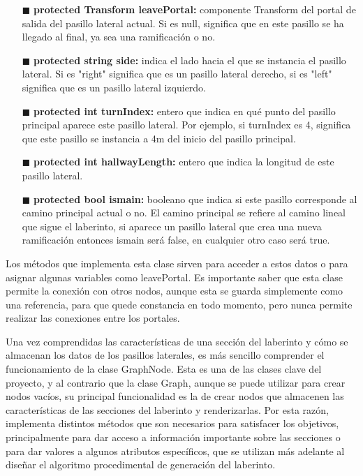\documentclass[../main.tex]{subfiles}
\begin{document}
\begin{itemize}
    \item[$\blacksquare$] \textbf{protected Transform leavePortal:} componente Transform del portal de salida del pasillo lateral actual. Si es null, significa que en este pasillo se ha llegado al final, ya sea una ramificación o no.
    \item[$\blacksquare$] \textbf{protected string side:} indica el lado hacia el que se instancia el pasillo lateral. Si es "right" significa que es un pasillo lateral derecho, si es "left" significa que es un pasillo lateral izquierdo.
    \item[$\blacksquare$] \textbf{protected int turnIndex:} entero que indica en qué punto del pasillo principal aparece este pasillo lateral. Por ejemplo, si turnIndex es 4, significa que este pasillo se instancia a 4m del inicio del pasillo principal.
    \item[$\blacksquare$] \textbf{protected int hallwayLength:} entero que indica la longitud de este pasillo lateral.
    \item[$\blacksquare$] \textbf{protected bool ismain:} booleano que indica si este pasillo corresponde al camino principal actual o no. El camino principal se refiere al camino lineal que sigue el laberinto, si aparece un pasillo lateral que crea una nueva ramificación entonces ismain será false, en cualquier otro caso será true.
\end{itemize}

Los métodos que implementa esta clase sirven para acceder a estos datos o para asignar algunas variables como leavePortal. Es importante saber que esta clase permite la conexión con otros nodos, aunque esta se guarda simplemente como una referencia, para que quede constancia en todo momento, pero nunca permite realizar las conexiones entre los portales.



Una vez comprendidas las características de una sección del laberinto y cómo se almacenan los datos de los pasillos laterales, es más sencillo comprender el funcionamiento de la clase GraphNode. Esta es una de las clases clave del proyecto, y al contrario que la clase Graph, aunque se puede utilizar para crear nodos vacíos, su principal funcionalidad es la de crear nodos que almacenen las características de las secciones del laberinto y renderizarlas. Por esta razón, implementa distintos métodos que son necesarios para satisfacer los objetivos, principalmente para dar acceso a información importante sobre las secciones o para dar valores a algunos atributos específicos, que se utilizan más adelante al diseñar el algoritmo procedimental de generación del laberinto. 
\end{document}
